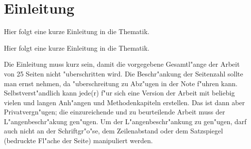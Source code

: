 \chapter{Einleitung}

Hier folgt eine kurze Einleitung in die Thematik. 

Hier folgt eine kurze Einleitung in die Thematik.

Die Einleitung muss kurz sein, damit die vorgegebene Gesamtl"ange der
Arbeit von 25 Seiten nicht "uberschritten wird. Die Beschr"ankung der
Seitenzahl sollte man ernst nehmen, da "uberschreitung zu Abz"ugen in
der Note f"uhren kann. Selbstverst"andlich kann jede(r) f"ur sich eine
Version der Arbeit mit beliebig vielen und langen Anh"angen und
Methodenkapiteln erstellen. Das ist dann aber Privatvergn"ugen; die
einzureichende und zu beurteilende Arbeit muss der
L"angenbeschr"akung gen"ugen. Um der L"angenbeschr"ankung zu gen"ugen,
darf auch nicht an der Schriftgr"o"se, dem Zeilenabstand oder dem
Satzspiegel (bedruckte Fl"ache der Seite) manipuliert werden.

\FloatBarrier